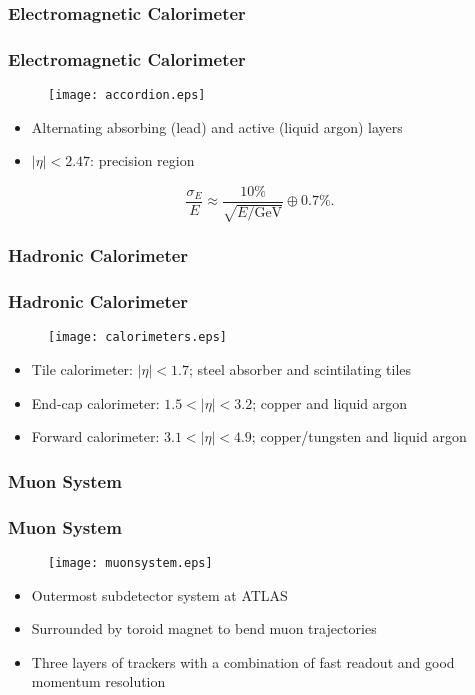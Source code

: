 \subsubsection{Electromagnetic Calorimeter}

\begin{frame}
\centering
\frametitle{Electromagnetic Calorimeter}
\begin{figure}
\texttt{[image: accordion.eps]}
\end{figure}
\begin{itemize}
\item Alternating absorbing (lead) and active (liquid argon) layers
\item $|\eta| < 2.47$: precision region
\end{itemize}
\begin{equation*}
\frac{\sigma_E}{E} \approx \frac{10\%}{\sqrt{E/\mathrm{GeV}}} \oplus 0.7\%.
\end{equation*}
\end{frame}

\subsubsection{Hadronic Calorimeter}

\begin{frame}
\centering
\frametitle{Hadronic Calorimeter}
\begin{figure}
\texttt{[image: calorimeters.eps]}
\end{figure}
\begin{itemize}
    \item Tile calorimeter: $|\eta| < 1.7$; steel absorber and
        scintilating tiles
    \item End-cap calorimeter: $1.5 < |\eta| < 3.2$; copper and liquid
        argon
    \item Forward calorimeter: $3.1 < |\eta| < 4.9$; copper/tungsten and
        liquid argon
\end{itemize}
\end{frame}

\subsubsection{Muon System}

\begin{frame}
\centering
\frametitle{Muon System}
\begin{figure}
\texttt{[image: muonsystem.eps]}
\end{figure}
\begin{itemize}
\item Outermost subdetector system at ATLAS
\item Surrounded by toroid magnet to bend muon trajectories
\item Three layers of trackers with a combination of fast readout and
    good momentum resolution
\end{itemize}
\end{frame}

